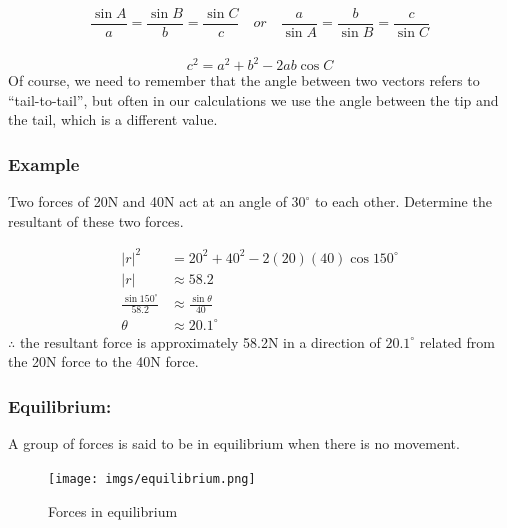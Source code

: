 \documentclass{article}
\begin{document}
 $$\frac{\sin A}{a}=\frac{\sin B}{b}=\frac{\sin C}{c} \quad or \quad \frac{a}{\sin A}=\frac{b}{\sin B}=\frac{c}{\sin C}$$\\

 $$c^2=a^2+b^2-2ab\cos C$$
 Of course, we need to remember that the angle between two vectors refers to “tail-to-tail”, but often in our calculations we use the angle between the tip and the tail, which is a different value.
 \subsubsection*{Example}
Two forces of 20N and 40N act at an angle of $30^{\circ}$ to each other.  Determine the resultant of these two forces.
\begin{center}
\end{center}

\begin{align*}
    |r|^2&=20^2+40^2-2(20)(40)\cos 150 ^{\circ}\\
    |r|&\approx 58.2\\
    \frac{\sin 150^{\circ}}{58.2}&\approx \frac{\sin \theta}{40}\\
    \theta &\approx 20.1^{\circ}
\end{align*}
$\therefore$ the resultant force is approximately 58.2N in a direction of $20.1^{\circ}$ related from the 20N force to the 40N force.\\
\newpage 

\subsubsection{Equilibrium:} A group of forces is said to be in equilibrium when there is no movement.
\begin{figure}[h]
    \centering
    \texttt{[image: imgs/equilibrium.png]}
    \caption{Forces in equilibrium}
\end{figure}
\end{document}
